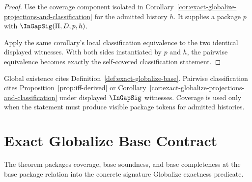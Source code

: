 \begin{proof}
Use the coverage component isolated in Corollary~\ref{cor:exact-globalize-projections-and-classification} for the admitted history $h$. It supplies a package $p$ with $\InGapSig(\Pi,D,p,h)$.

Apply the same corollary's local classification equivalence to the two identical displayed witnesses. With both sides instantiated by $p$ and $h$, the pairwise equivalence becomes exactly the self-covered classification statement.
\end{proof}

\begin{protocol}
\label{prot:exactness-export-discipline}
Global existence cites Definition~\ref{def:exact-globalize-base}. Pairwise classification cites Proposition~\ref{prop:iff-derived} or Corollary~\ref{cor:exact-globalize-projections-and-classification} under displayed $\InGapSig$ witnesses. Coverage is used only when the statement must produce visible package tokens for admitted histories.
\end{protocol}

\section{Exact Globalize Base Contract}
\label{sec:po-exact-globalize-base-contract}

The theorem packages coverage, base soundness, and base completeness at the base package relation into the concrete signature Globalize exactness predicate.

